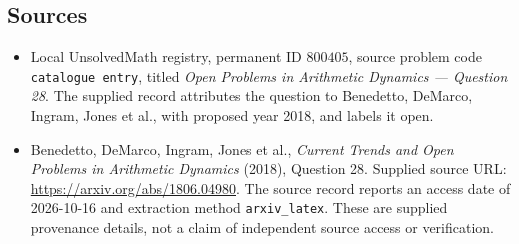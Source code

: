 \documentclass[11pt]{article}
\begin{document}
\subsection{Sources}
\begin{itemize}
\item Local UnsolvedMath registry, permanent ID \(800405\), source problem code \texttt{catalogue entry}, titled \emph{Open Problems in Arithmetic Dynamics --- Question 28}. The supplied record attributes the question to Benedetto, DeMarco, Ingram, Jones et al., with proposed year 2018, and labels it open.
\item Benedetto, DeMarco, Ingram, Jones et al., \emph{Current Trends and Open Problems in Arithmetic Dynamics} (2018), Question 28. Supplied source URL: \url{https://arxiv.org/abs/1806.04980}. The source record reports an access date of 2026-10-16 and extraction method \texttt{arxiv\_latex}. These are supplied provenance details, not a claim of independent source access or verification.
\end{itemize}
\end{document}
